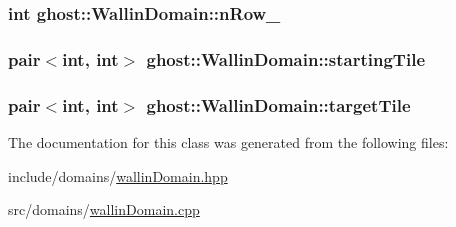 \hypertarget{classghost_1_1WallinDomain_a2b4915025259fff122a44cfe5dca4b9e}{
\subsubsection[{n\-Row\-\_\-}]{\setlength{\rightskip}{0pt plus 5cm}int ghost\-::\-Wallin\-Domain\-::n\-Row\-\_\-\hspace{0.3cm}{\ttfamily [private]}}}\label{classghost_1_1WallinDomain_a2b4915025259fff122a44cfe5dca4b9e}
\hypertarget{classghost_1_1WallinDomain_aca537784fa6aa04effeb402d936530ce}{
\subsubsection[{starting\-Tile}]{\setlength{\rightskip}{0pt plus 5cm}pair$<$int, int$>$ ghost\-::\-Wallin\-Domain\-::starting\-Tile\hspace{0.3cm}{\ttfamily [private]}}}\label{classghost_1_1WallinDomain_aca537784fa6aa04effeb402d936530ce}
\hypertarget{classghost_1_1WallinDomain_a3a2cc8acb828fadffbe92fbe8f57cc9f}{
\subsubsection[{target\-Tile}]{\setlength{\rightskip}{0pt plus 5cm}pair$<$int, int$>$ ghost\-::\-Wallin\-Domain\-::target\-Tile\hspace{0.3cm}{\ttfamily [private]}}}\label{classghost_1_1WallinDomain_a3a2cc8acb828fadffbe92fbe8f57cc9f}


The documentation for this class was generated from the following files\-:\begin{DoxyCompactItemize}
\item 
include/domains/\hyperlink{wallinDomain_8hpp}{wallin\-Domain.\-hpp}\item 
src/domains/\hyperlink{wallinDomain_8cpp}{wallin\-Domain.\-cpp}\end{DoxyCompactItemize}
